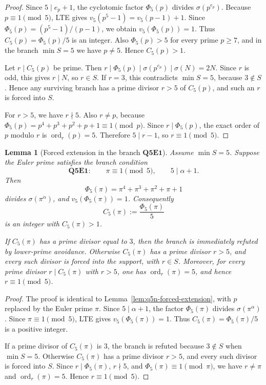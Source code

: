 \documentclass[11pt]{article}
\newtheorem{lemma}[theorem]{Lemma}
\theoremstyle{definition}
\theoremstyle{remark}
\DeclareMathOperator{\ord}{ord}
\begin{document}
\begin{proof}
Since \(5\mid e_p+1\), the cyclotomic factor \(\Phi_5(p)\) divides
\(\sigma(p^{e_p})\).  Because \(p\equiv1\pmod5\), LTE gives
\(v_5(p^5-1)=v_5(p-1)+1\).  Since \(\Phi_5(p)=(p^5-1)/(p-1)\), we obtain
\(v_5(\Phi_5(p))=1\).  Thus \(C_5(p)=\Phi_5(p)/5\) is an integer.  Also
\(\Phi_5(p)>5\) for every prime \(p\ge7\), and in the branch \(\min S=5\) we
have \(p\ne5\).  Hence \(C_5(p)>1\).

Let \(r\mid C_5(p)\) be prime.  Then
\(r\mid\Phi_5(p)\mid\sigma(p^{e_p})\mid\sigma(N)=2N\).  Since \(r\) is odd,
this gives \(r\mid N\), so \(r\in S\).  If \(r=3\), this contradicts
\(\min S=5\), because \(3\notin S\).  Hence any surviving branch has a prime
divisor \(r>5\) of \(C_5(p)\), and such an \(r\) is forced into \(S\).

For \(r>5\), we have \(r\nmid5\).  Also \(r\ne p\), because
\(\Phi_5(p)=p^4+p^3+p^2+p+1\equiv1\pmod p\).  Since \(r\mid\Phi_5(p)\), the
exact order of \(p\) modulo \(r\) is \(\ord_r(p)=5\).  Therefore \(5\mid r-1\),
so \(r\equiv1\pmod5\).
\end{proof}

\begin{lemma}[Forced extension in the branch $\mathbf{Q5E1}$]
\label{lem:q5e1-forced-extension}
Assume \(\min S=5\).
Suppose the Euler prime satisfies the branch condition
\[
  \mathbf{Q5E1}:\qquad
  \pi\equiv1\pmod5,
  \qquad
  5\mid\alpha+1.
\]
Then
\[
  \Phi_5(\pi)=\pi^4+\pi^3+\pi^2+\pi+1
\]
divides \(\sigma(\pi^\alpha)\), and \(v_5(\Phi_5(\pi))=1\).
Consequently
\[
  C_5(\pi):=\frac{\Phi_5(\pi)}5
\]
is an integer with \(C_5(\pi)>1\).

If \(C_5(\pi)\) has a prime divisor equal to \(3\), then the branch is
immediately refuted by lower-prime avoidance.  Otherwise \(C_5(\pi)\) has a
prime divisor \(r>5\), and every such divisor is forced into the support, with
\(r\in S\).  Moreover, for every prime divisor \(r\mid C_5(\pi)\) with \(r>5\),
one has \(\ord_r(\pi)=5\), and hence \(r\equiv1\pmod5\).
\end{lemma}

\begin{proof}
The proof is identical to Lemma~\ref{lem:q5n-forced-extension}, with \(p\)
replaced by the Euler prime \(\pi\).  Since \(5\mid\alpha+1\), the factor
\(\Phi_5(\pi)\) divides \(\sigma(\pi^\alpha)\).  Since \(\pi\equiv1\pmod5\),
LTE gives \(v_5(\Phi_5(\pi))=1\).  Thus \(C_5(\pi)=\Phi_5(\pi)/5\) is a
positive integer.

If a prime divisor of \(C_5(\pi)\) is \(3\), the branch is refuted because
\(3\notin S\) when \(\min S=5\).
Otherwise \(C_5(\pi)\) has a prime divisor \(r>5\), and every such divisor is
forced into \(S\).  Since \(r\mid\Phi_5(\pi)\), \(r\nmid5\), and
\(\Phi_5(\pi)\equiv1\pmod\pi\), we have \(r\ne\pi\) and \(\ord_r(\pi)=5\).
Hence \(r\equiv1\pmod5\).
\end{proof}
\end{document}
